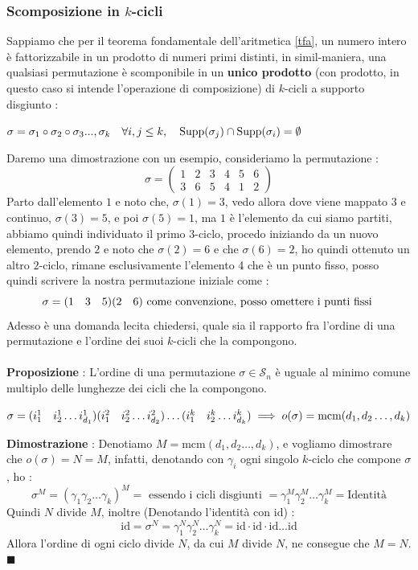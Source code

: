 \documentclass[12pt, letterpaper]{article}
\newcommand{\Sn}{{\mathcal S_n}}
\newcommand{\mcm}{{\text{mcm}}}
\newcommand{\spaz}{{\text{\hphantom{aa}}}}
\newcommand{\supp}{{\text{Supp}}}
\newcommand{\acc}{\\\hphantom{}\\}
\begin{document}
\subsubsection{Scomposizione in \(k\)-cicli}
Sappiamo che per il teorema fondamentale dell'aritmetica \ref{tfa}, un numero intero è fattorizzabile in 
un prodotto di numeri primi distinti, in simil-maniera, una qualsiasi permutazione è scomponibile in 
un \textbf{unico prodotto} (con prodotto, in questo caso si intende l'operazione di composizione) di 
\(k\)-cicli a supporto disgiunto : \begin{center}
    \(
    \sigma = \sigma_1\circ\sigma_2\circ\sigma_3...,\sigma_k \spaz   \forall i,j\le k,\spaz\supp(\sigma_j)\cap\supp(\sigma_i)=\emptyset 
    \)
\end{center}
Daremo una dimostrazione con un esempio, consideriamo la permutazione : \begin{equation}
    \sigma=\begin{pmatrix}
        1 & 2 & 3&4&5&6\\
        3 & 6 & 5&4&1&2
        \end{pmatrix}
\end{equation}
Parto dall'elemento \(1\) e noto che, \(\sigma(1)=3\), vedo allora dove viene mappato \(3\) e continuo, 
\(\sigma(3)=5\), e poi \(\sigma(5)=1\), ma \(1\) è l'elemento da cui siamo partiti, abbiamo quindi individuato 
il primo \(3\)-ciclo, procedo iniziando da un nuovo elemento, prendo \(2\) e noto che \(\sigma(2)=6\) e che 
\(\sigma(6)=2\), ho quindi ottenuto un altro \(2\)-ciclo, rimane esclusivamente l'elemento 4 che è un punto fisso, posso 
quindi scrivere la nostra permutazione iniziale come :\begin{equation}
    \sigma=(1\spaz3\spaz5)(2\spaz6) \text{ come convenzione, posso omettere i punti fissi }
\end{equation}
Adesso è una domanda lecita chiedersi, quale sia il rapporto fra l'ordine di una permutazione e 
l'ordine dei suoi \(k\)-cicli che la compongono. \acc 
\textbf{Proposizione }: L'ordine di una permutazione \(\sigma\in\Sn\) è uguale al 
minimo comune multiplo delle lunghezze dei cicli che la compongono.\begin{center}
   \( 
        \sigma=(i^{1}_1\spaz i^{1}_2 \dots i^{1}_{d_1})(i^{2}_1\spaz i^{2}_2 \dots i^{2}_{d_2})\dots(i^{k}_1\spaz i^{k}_2 \dots i^{k}_{d_k})
    \implies o(\sigma)=\mcm(d_1,d_2\dots,d_k)\)
\end{center}
\textbf{Dimostrazione} : Denotiamo \(M=\mcm(d_1,d_2\dots,d_k)\), e vogliamo dimostrare che 
\(o(\sigma)=N=M\), infatti, denotando con \(\gamma_i\) ogni singolo \(k\)-ciclo che compone \(\sigma\), ho : \begin{equation}
    \sigma^{M}=(\gamma_1\gamma_2\dots\gamma_k)^{M}=\text{ essendo i cicli disgiunti }=\gamma_1^M\gamma_2^M\dots\gamma_k^M=\text{Identità}
\end{equation}
Quindi \(N\) divide \(M\), inoltre (Denotando l'identità con id) :\begin{equation}
    \text{id}=\sigma^N=\gamma_1^N\gamma_2^N\dots\gamma_k^N=\text{id}\cdot \text{id}\cdot \text{id}\dots \text{id}
\end{equation}
Allora l'ordine di ogni ciclo divide \(N\), da cui \(M\) divide \(N\), ne consegue che \(M=N\). \(\blacksquare\)
\end{document}
